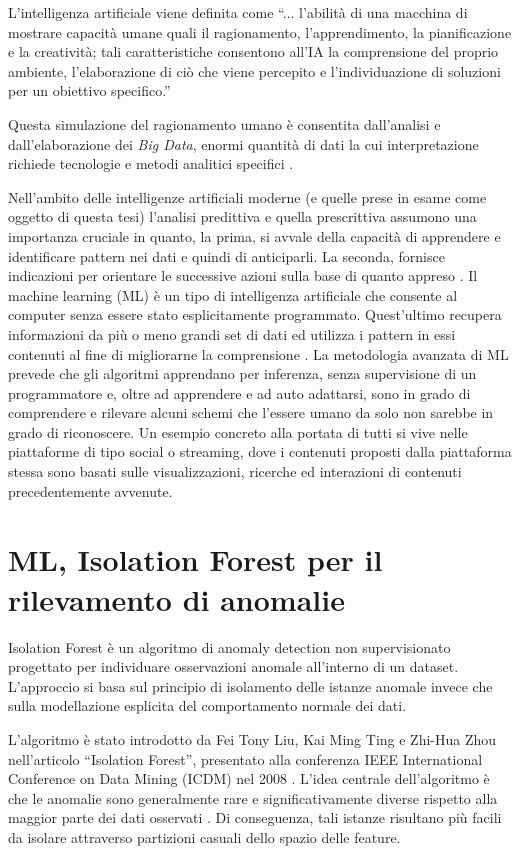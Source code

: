L’intelligenza artificiale viene definita come “... l’abilità di una macchina di mostrare capacità umane quali il ragionamento, l’apprendimento, la pianificazione e la creatività; tali caratteristiche consentono all’IA la comprensione del proprio ambiente, l’elaborazione di ciò che viene percepito e l’individuazione di soluzioni per un obiettivo specifico.” \parencite{aida2021parlamento}

Questa simulazione del ragionamento umano è consentita dall’analisi e dall’elaborazione dei \emph{Big Data}, enormi quantità di dati la cui interpretazione richiede tecnologie e metodi analitici specifici \parencite{demauro2016bigdata}.

Nell’ambito delle intelligenze artificiali moderne (e quelle prese in esame come oggetto di questa tesi) l’analisi predittiva e quella prescrittiva assumono una importanza cruciale in quanto, la prima, si avvale della capacità di apprendere e identificare pattern nei dati e quindi di anticiparli. La seconda, fornisce indicazioni per orientare le successive azioni sulla base di quanto appreso \parencite{hullermeier2021prescriptive}.
Il machine learning (ML) è un tipo di intelligenza artificiale che consente al computer senza essere stato esplicitamente programmato.
Quest’ultimo recupera informazioni da più o meno grandi set di dati ed utilizza i pattern in essi contenuti al fine di migliorarne la comprensione \parencite{sharifani2023machine}. La metodologia avanzata di ML prevede che gli algoritmi apprendano per inferenza, senza supervisione di un programmatore e, oltre ad apprendere e ad auto adattarsi, sono in grado di comprendere e rilevare alcuni schemi che l’essere umano da solo non sarebbe in grado di riconoscere. Un esempio concreto alla portata di tutti si vive nelle piattaforme di tipo social o streaming, dove i contenuti proposti dalla piattaforma stessa sono basati sulle visualizzazioni, ricerche ed interazioni di contenuti precedentemente avvenute.

\section{ML, Isolation Forest per il rilevamento di anomalie}
Isolation Forest è un algoritmo di anomaly detection non supervisionato progettato per individuare osservazioni anomale all’interno di un dataset. L’approccio si basa sul principio di isolamento delle istanze anomale invece che sulla modellazione esplicita del comportamento normale dei dati.

L’algoritmo è stato introdotto da Fei Tony Liu, Kai Ming Ting e Zhi-Hua Zhou nell’articolo “Isolation Forest”, presentato alla conferenza IEEE International Conference on Data Mining (ICDM) nel 2008 \parencite{liu2008isolation}. L’idea centrale dell’algoritmo è che le anomalie sono generalmente rare e significativamente diverse rispetto alla maggior parte dei dati osservati \parencite{liu2012isolationbased}. Di conseguenza, tali istanze risultano più facili da isolare attraverso partizioni casuali dello spazio delle feature.

